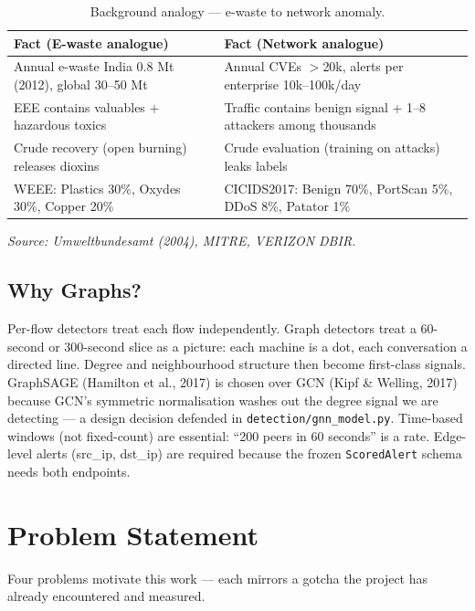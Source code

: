 \documentclass[12pt,a4paper,oneside]{report}
\newcommand{\bluetableheader}{\rowcolor{headerblue}\color{white}\bfseries}
\begin{document}
\begin{table}[H]
\centering
\caption{Background analogy — e-waste to network anomaly.}
\label{tab:1.1}
\begin{tabular}{|L{7.2cm}|L{7.2cm}|}
\hline
\bluetableheader Fact (E-waste analogue) & Fact (Network analogue) \\ \hline
{} Annual e-waste India 0.8 Mt (2012), global 30--50 Mt & Annual CVEs $>$20k, alerts per enterprise 10k--100k/day \\ \hline
EEE contains valuables + hazardous toxics & Traffic contains benign signal + 1--8 attackers among thousands \\ \hline
{} Crude recovery (open burning) releases dioxins & Crude evaluation (training on attacks) leaks labels \\ \hline
WEEE: Plastics 30\%, Oxydes 30\%, Copper 20\% & CICIDS2017: Benign 70\%, PortScan 5\%, DDoS 8\%, Patator 1\% \\ \hline
\end{tabular}
\par\small\textit{Source: Umweltbundesamt (2004), MITRE, VERIZON DBIR.}
\end{table}

\subsection{Why Graphs?}
Per-flow detectors treat each flow independently. Graph detectors treat a 60-second or 300-second slice as a picture: each machine is a dot, each conversation a directed line. Degree and neighbourhood structure then become first-class signals. GraphSAGE (Hamilton et al., 2017) is chosen over GCN (Kipf \& Welling, 2017) because GCN's symmetric normalisation washes out the degree signal we are detecting — a design decision defended in \texttt{detection/gnn\_model.py}. Time-based windows (not fixed-count) are essential: ``200 peers in 60 seconds'' is a rate. Edge-level alerts (src\_ip, dst\_ip) are required because the frozen \texttt{ScoredAlert} schema needs both endpoints.

\section{Problem Statement}
Four problems motivate this work — each mirrors a gotcha the project has already encountered and measured.
\end{document}
